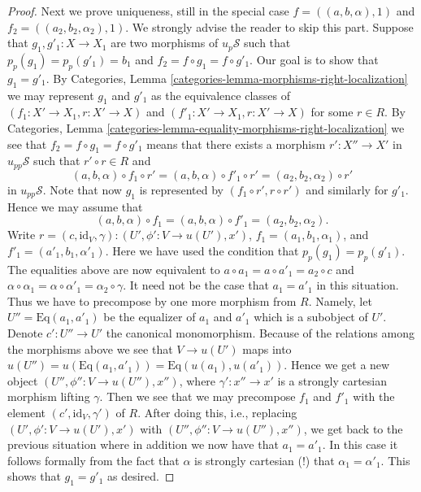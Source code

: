 \begin{proof}
\medskip\noindent
Next we prove uniqueness, still in the special case
$f = ((a, b, \alpha), 1)$ and $f_2 = ((a_2, b_2, \alpha_2), 1)$.
We strongly advise the reader to skip this part.
Suppose that $g_1, g'_1 : X \to X_1$ are two morphisms of
$u_p\mathcal{S}$ such that $p_p(g_1) = p_p(g'_1) = b_1$ and
$f_2 = f \circ g_1 = f \circ g'_1$. Our goal is to show that
$g_1 = g'_1$. By
Categories, Lemma \ref{categories-lemma-morphisms-right-localization}
we may represent $g_1$ and $g'_1$ as the equivalence classes of
$(f_1 : X' \to X_1, r : X' \to X)$ and
$(f'_1 : X' \to X_1, r : X' \to X)$ for some $r \in R$. By
Categories, Lemma \ref{categories-lemma-equality-morphisms-right-localization}
we see that $f_2 = f \circ g_1 = f \circ g'_1$ means that there
exists a morphism $r' : X'' \to X'$ in $u_{pp}\mathcal{S}$ such that
$r' \circ r \in R$ and
$$
(a, b, \alpha) \circ f_1 \circ r' =
(a, b, \alpha) \circ f'_1 \circ r' =
(a_2, b_2, \alpha_2) \circ r'
$$
in $u_{pp}\mathcal{S}$. Note that
now $g_1$ is represented by $(f_1 \circ r', r \circ r')$ and
similarly for $g'_1$. Hence we may assume that
$$
(a, b, \alpha) \circ f_1 =
(a, b, \alpha) \circ f'_1 =
(a_2, b_2, \alpha_2).
$$
Write $r = (c, \text{id}_V, \gamma) : (U', \phi' : V \to u(U'), x')$,
$f_1 = (a_1, b_1, \alpha_1)$, and $f'_1 = (a'_1, b_1, \alpha'_1)$.
Here we have used the condition that $p_p(g_1) = p_p(g'_1)$.
The equalities above are now equivalent to
$a \circ a_1 = a \circ a'_1 = a_2 \circ c$ and
$\alpha \circ \alpha_1 = \alpha \circ \alpha'_1 = \alpha_2 \circ \gamma$.
It need not be the case that $a_1 = a'_1$ in this situation.
Thus we have to precompose by one more morphism from $R$.
Namely, let $U'' = \text{Eq}(a_1, a'_1)$ be the equalizer of
$a_1$ and $a'_1$ which is a subobject of $U'$. Denote
$c' : U'' \to U'$ the canonical monomorphism.
Because of the relations among the morphisms
above we see that $V \to u(U')$ maps into
$u(U'') = u(\text{Eq}(a_1, a'_1)) = \text{Eq}(u(a_1), u(a'_1))$.
Hence we get a new object $(U'', \phi'' : V \to u(U''), x'')$, where
$\gamma' : x'' \to x'$ is a strongly cartesian morphism lifting $\gamma$.
Then we see that we may precompose $f_1$ and $f'_1$ with the element
$(c', \text{id}_V, \gamma')$ of $R$. After doing this, i.e., replacing
$(U', \phi' : V \to u(U'), x')$ with
$(U'', \phi'' : V \to u(U''), x'')$, we get back to the previous
situation where in addition we now have that $a_1 = a'_1$.
In this case it follows formally from the fact that $\alpha$
is strongly cartesian (!) that $\alpha_1 = \alpha'_1$.
This shows that $g_1 = g'_1$ as desired.


\end{proof}
